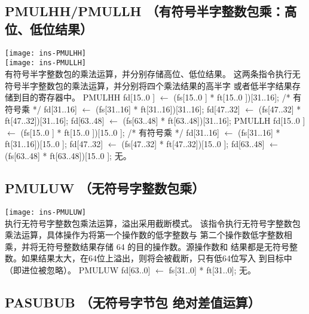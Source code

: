 \subsection{PMULHH/PMULLH （有符号半字整数包乘：高位、低位结果）}

\begin{instructionblk}
  \texttt{[image: ins-PMULHH]} \\
  \texttt{[image: ins-PMULLH]} \\
  {有符号半字整数包的乘法运算，并分别存储高位、低位结果。}
  {这两条指令执行无符号半字整数包的乘法运算，并分别将四个乘法结果的高半字
  或者低半字结果存储到目的寄存器中。}
  {PMULHH \narrownewline
  fd[15..0 ] $\leftarrow$ (fs[15..0 ] * ft[15..0 ])[31..16]; /* 有符号乘 */ \narrownewline
  fd[31..16] $\leftarrow$ (fs[31..16] * ft[31..16])[31..16]; \narrownewline
  fd[47..32] $\leftarrow$ (fs[47..32] * ft[47..32])[31..16]; \narrownewline
  fd[63..48] $\leftarrow$ (fs[63..48] * ft[63..48])[31..16]; \narrownewline \narrownewline
  PMULLH \narrownewline
  fd[15..0 ] $\leftarrow$ (fs[15..0 ] * ft[15..0 ])[15..0 ]; /* 有符号乘 */ \narrownewline
  fd[31..16] $\leftarrow$ (fs[31..16] * ft[31..16])[15..0 ]; \narrownewline
  fd[47..32] $\leftarrow$ (fs[47..32] * ft[47..32])[15..0 ]; \narrownewline
  fd[63..48] $\leftarrow$ (fs[63..48] * ft[63..48])[15..0 ];}
  {无。}
\end{instructionblk}

\subsection{PMULUW （无符号字整数包乘）}

\begin{instructionblk}
  \texttt{[image: ins-PMULUW]} \\
  {执行无符号字整数包乘法运算，溢出采用截断模式。}
  {该指令执行无符号字整数包乘法运算，具体操作为将第一个操作数的低字整数与
  第二个操作数低字整数相乘，并将无符号整数结果存储 64 的目的操作数。源操作数和
  结果都是无符号整数。如果结果太大，在64位上溢出，则将会被截断，只有低64位写入
  到目标中（即进位被忽略）。}
  {PMULUW \narrownewline
  fd[63..0] $\leftarrow$ fs[31..0] * ft[31..0];}
  {无。}
\end{instructionblk}

\subsection{PASUBUB （无符号字节包 绝对差值运算）}

